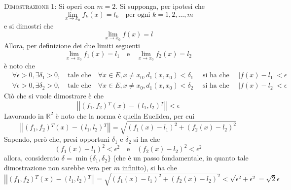 \documentclass[a4paper]{extarticle}
\begin{document}
\vspace{2em}
\noindent
\normalfont \normalsize
\textsc{Dimostrazione 1}: Si operi con $m=2$. Si supponga, per ipotesi che
\[\lim_{x \to x_0} f_k(x) = l_k \hspace{1em} \text{per ogni } k =1,2,\dots,m\]
e si dimostri che
\[\lim_{x \to x_0} f(x) = l\]
Allora, per definizione dei due limiti seguenti
\[\lim_{x \to x_0} f_1(x) = l_1 \hspace{1em} \text{e} \hspace{1em} \lim_{x \to x_0} f_2(x) = l_2\]
è noto che
\begin{align*}
    &\forall \epsilon>0, \exists \delta_1 > 0, \hspace{1em} \text{tale che} \hspace{1em} \forall x \in E, x \neq x_0, d_1(x,x_0) < \delta_1 \hspace{1em} \text{ si ha che } \hspace{1em} \left \vert f(x) - l_1 \right \vert < \epsilon\\
    &\forall \epsilon>0, \exists \delta_2 > 0, \hspace{1em} \text{tale che} \hspace{1em} \forall x \in E, x \neq x_0, d_1(x,x_0) < \delta_2 \hspace{1em} \text{ si ha che } \hspace{1em} \left \vert f(x) - l_2 \right \vert < \epsilon
\end{align*}
Ciò che si vuole dimostrare è che
\[\left \vert \left \vert (f_1,f_2){^T}(x) - (l_1,l_2){^T} \right \vert \right \vert < \epsilon\]
Lavorando in $\mathbb{R}^2$ è noto che la norma è quella Euclidea, per cui
\[\left \vert \left \vert (f_1,f_2){^T}(x) - (l_1,l_2){^T} \right \vert \right \vert = \sqrt{(f_1(x)-l_1)^2+(f_2(x)-l_2)^2}\]
Sapendo, però che, presi opportuni $\delta_1$ e $\delta_2$ si ha che
\[(f_1(x)-l_1)^2 < \epsilon^2 \hspace{1em} \text{e} \hspace{1em} (f_2(x)-l_2)^2 < \epsilon^2\]
allora, considerato $\delta = \min\{\delta_1,\delta_2\}$ (che è un passo fondamentale, in quanto tale dimostrazione non sarebbe vera per $m$ infinito), si ha che
\[\left \vert \left \vert (f_1,f_2){^T}(x) - (l_1,l_2){^T} \right \vert \right \vert = \sqrt{(f_1(x)-l_1)^2+(f_2(x)-l_2)^2} < \sqrt{\epsilon^2+\epsilon^2} = \sqrt{2} \epsilon\]
\end{document}
